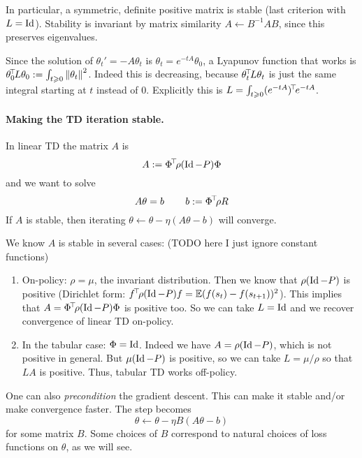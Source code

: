 \documentclass[11pt,a4paper]{article}
\begin{document}
In particular, a symmetric, definite positive matrix is stable (last
criterion with $L=\operatorname{Id}$).
Stability is invariant by matrix similarity $A\gets B^{-1}A B$, since
this preserves eigenvalues.

Since the
solution of $\theta_t'=-A\theta_t$ is $\theta_t=e^{-tA}\theta_0$, a
Lyapunov function that works is $\theta_0^{\!\top}\!L\theta_0\mathrel{\mathop{:}}= \int_{t \geqslant 0}
\left\lVert\theta_t\right\rVert^2$. Indeed this is decreasing, because
$\theta_t^{\!\top}\!L\theta_t$ is just the same integral starting at $t$
instead of $0$. Explicitly this is
$L=\int_{t\geqslant 0} (e^{-t A})^{\!\top}\!
e^{-tA}$.

\paragraph{Making the TD iteration stable.} In linear TD the matrix $A$ is
\begin{equation}
A\mathrel{\mathop{:}}= \Phi^{\!\top}\!\rho (\operatorname{Id}-P)\Phi
\end{equation}
and we want to solve
\begin{equation}
A\theta=b\,\qquad b\mathrel{\mathop{:}}= \Phi^{\!\top}\!\rho R
\end{equation}
If $A$ is stable, then iterating $\theta\gets \theta -\eta(A\theta-b)$ will
converge.

We know $A$ is stable in several cases: (TODO here I just ignore constant
functions)
\begin{enumerate}
\item On-policy: $\rho=\mu$, the invariant distribution. Then we know that $\rho(\operatorname{Id}-P)$ is positive
(Dirichlet form: $f^{\!\top}\!\rho(\operatorname{Id}-P)f=\mathbb{E}(f(s_t)-f(s_{t+1}))^2$). This implies that $A=\Phi^{\!\top}\!\rho (\operatorname{Id}-P)\Phi$ is
positive too. So we can take $L=\operatorname{Id}$ and we recover convergence of linear
TD on-policy.
\item In the tabular case: $\Phi=\operatorname{Id}$. Indeed we have $A=\rho (\operatorname{Id}-P)$,
which is not positive in general. But $\mu (\operatorname{Id}-P)$ is positive, so we can take
$L=\mu/\rho$ so that $LA$ is positive. Thus, tabular TD works
off-policy.
\end{enumerate}

One can also \emph{precondition} the gradient descent. This can make it
stable and/or make convergence faster. The step becomes
\begin{equation}
\theta\gets \theta-\eta B(A\theta-b)
\end{equation}
for some matrix $B$. Some choices of $B$ correspond to natural choices of
loss functions on $\theta$, as we will see.
\end{document}
